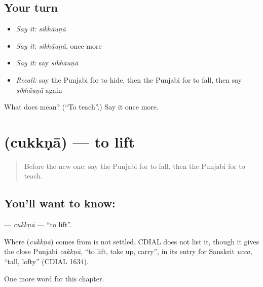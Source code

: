 \subsection*{Your turn}
\begin{itemize}
\raggedright
  \item \emph{Say it:} \emph{sikhāuṇā}
  \item \emph{Say it:} \emph{sikhāuṇā}, once more
  \item \emph{Say it:} say \emph{sikhāuṇā}
  \item \emph{Recall:} say the Punjabi for to hide, then the Punjabi for to fall, then say \emph{sikhāuṇā} again
\end{itemize}

\begin{tcolorbox}[breakable,colback=teal!4,colframe=teal!35!black,title={Before you move on}]
What does  mean? (\textquotedblleft{}To teach\textquotedblright{}.) Say it once more.
\end{tcolorbox}
\section[\texorpdfstring{\pa{ਚੁੱਕਣਾ} (cukkṇā)}{ਚੁੱਕਣਾ (cukkṇā)}]{ (cukkṇā) — to lift}

\label{lesson:PA-C148-cukkna}



\begin{quote}
Before the new one: say the Punjabi for to fall, then the Punjabi for to teach.
\end{quote}

\subsection*{You'll want to know: }
\textbf{} — \emph{cukkṇā} — \textquotedblleft{}to lift\textquotedblright{}.

\begin{cousinweb}
Where \textbf{} (\emph{cukkṇā}) comes from is not settled. CDIAL does not list it, though it gives the close Punjabi \emph{cakkṇā}, \textquotedblleft{}to lift, take up, carry\textquotedblright{}, in its entry for Sanskrit \emph{ucca}, \textquotedblleft{}tall, lofty\textquotedblright{} (CDIAL 1634).
\end{cousinweb}

\begin{grammarlens}[title={What you've built}]
One more word for this chapter.
\end{grammarlens}

